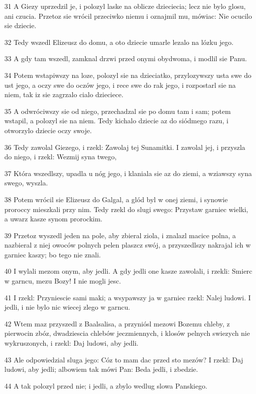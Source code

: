 \par 31 A Giezy uprzedzil je, i polozyl laske na oblicze dzieciecia; lecz nie bylo glosu, ani czucia. Przetoz sie wrócil przeciwko niemu i oznajmil mu, mówiac: Nie ocucilo sie dziecie.
\par 32 Tedy wszedl Elizeusz do domu, a oto dziecie umarle lezalo na lózku jego.
\par 33 A gdy tam wszedl, zamknal drzwi przed onymi obydwoma, i modlil sie Panu.
\par 34 Potem wstapiwszy na loze, polozyl sie na dzieciatko, przylozywszy usta swe do ust jego, a oczy swe do oczów jego, i rece swe do rak jego, i rozpostarl sie na niem, tak iz sie zagrzalo cialo dzieciece.
\par 35 A odwróciwszy sie od niego, przechadzal sie po domu tam i sam; potem wstapil, a polozyl sie na niem. Tedy kichalo dziecie az do siódmego razu, i otworzylo dziecie oczy swoje.
\par 36 Tedy zawolal Giezego, i rzekl: Zawolaj tej Sunamitki. I zawolal jej, i przyszla do niego, i rzekl: Wezmij syna twego,
\par 37 Która wszedlszy, upadla u nóg jego, i klaniala sie az do ziemi, a wziawszy syna swego, wyszla.
\par 38 Potem wrócil sie Elizeusz do Galgal, a glód byl w onej ziemi, i synowie proroccy mieszkali przy nim. Tedy rzekl do slugi swego: Przystaw garniec wielki, a uwarz kasze synom prorockim.
\par 39 Przetoz wyszedl jeden na pole, aby zbieral ziola, i znalazl macice polna, a nazbieral z niej owoców polnych pelen plaszcz swój, a przyszedlszy nakrajal ich w garniec kaszy; bo tego nie znali.
\par 40 I wylali mezom onym, aby jedli. A gdy jedli one kasze zawolali, i rzekli: Smierc w garncu, mezu Bozy! I nie mogli jesc.
\par 41 I rzekl: Przyniescie sami maki; a wsypawszy ja w garniec rzekl: Nalej ludowi. I jedli, i nie bylo nic wiecej zlego w garncu.
\par 42 Wtem maz przyszedl z Baalsalisa, a przyniósl mezowi Bozemu chleby, z pierwocin zbóz, dwadziescia chlebów jeczmiennych, i klosów pelnych swiezych nie wykruszonych, i rzekl: Daj ludowi, aby jedli.
\par 43 Ale odpowiedzial sluga jego: Cóz to mam dac przed sto mezów? I rzekl: Daj ludowi, aby jedli; albowiem tak mówi Pan: Beda jedli, i zbedzie.
\par 44 A tak polozyl przed nie; i jedli, a zbylo wedlug slowa Panskiego.

